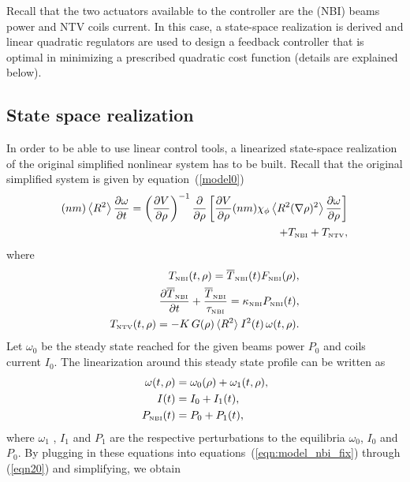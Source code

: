 \documentclass[12pt]{iopart}
\begin{document}
 Recall that the two actuators available to the controller are the (NBI) beams power and NTV coils current.
In this case, a state-space realization is derived and linear quadratic regulators are used to design a feedback controller that is optimal in minimizing a prescribed quadratic cost function (details are explained below).

\subsection{State space realization}
In order to be able to use linear control tools, a linearized state-space realization of the original simplified nonlinear system has to be built.
Recall that the original simplified system is given by equation~(\ref{model0})
\begin{eqnarray}
  (n m) \left<R^2\right>
 \frac{\partial \omega}{\partial t} \nonumber 
 = \left( \frac{\partial V}{\partial\rho}\right)^{-1}
   \frac{\partial}{\partial \rho} 
   \left[\frac{\partial V}{\partial \rho} (n m) \chi_\phi 
   \left< R^2 (\nabla \rho)^2\right> 
   \frac{\partial\omega}{\partial\rho}\right] \\
   + T_\textrm{\tiny NBI} + T_\textrm{\tiny NTV}, 
\label{eqn:model_nbi_fix}
\end{eqnarray}
where
\begin{eqnarray}
   T_\textrm{\tiny{NBI}}(t,\rho) = \overline{T}_\textrm{\tiny{NBI}}(t) F_\textrm{\tiny{NBI}}(\rho), \\
   \frac{\partial \overline{T}_\textrm{\tiny{NBI}}}{\partial t}
   + \frac{\overline{T}_\textrm{\tiny{NBI}}}{\tau_\textrm{\tiny{NBI}}}  = \kappa_\textrm{\tiny{NBI}} P_\textrm{\tiny{NBI}}(t), \label{eqn19}\\
   T_\textrm{\tiny NTV}  (t, \rho) =  - K \, G(\rho) \,  \langle R^2 \rangle \:  I^2(t) \,\omega (t, \rho) . \label{eqn20}
   \label{eq:sys_recall}
\end{eqnarray}
 Let $\omega_0$ be the steady state reached for the given beams power $ P_0$ and coils current $I_0$. The linearization around this steady state profile can be written as
\begin{eqnarray}
\omega (t, \rho) &= \omega_0 (\rho) + \omega_1(t, \rho), \\
I (t) &= I_0 + I_1(t),\\
P_\textrm{\tiny NBI} (t) &= P_0 + P_1(t),
\end{eqnarray}
where $ \omega_1$ , $ I_1$ and $P_1$ are the respective perturbations to the equilibria $\omega_0$, $I_0$ and $P_0$.
By plugging in these equations into equations~(\ref{eqn:model_nbi_fix}) through (\ref{eqn20}) and simplifying, we obtain
\end{document}
